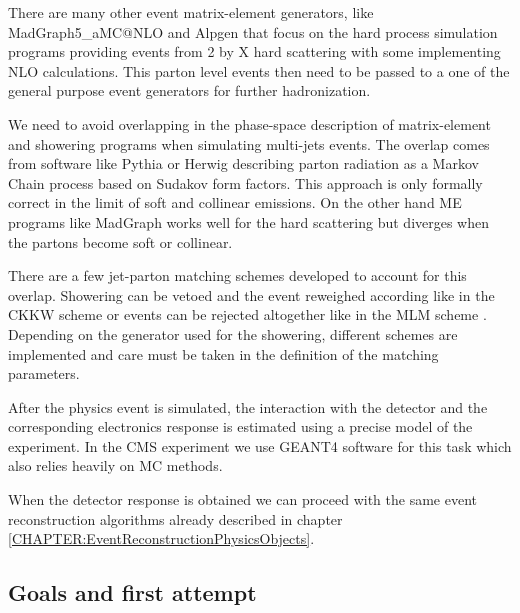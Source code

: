 There are many other event  matrix-element generators, like MadGraph5\_aMC@NLO \cite{ARTICLE:aMCatNLO} and Alpgen \cite{ARTICLE:ALPGENGenerator} that focus on the hard process simulation programs providing events from 2 by X hard scattering with some implementing \gls{NLO} calculations. This parton level events then need to be passed to a one of the general purpose event generators for further hadronization. 

We need to avoid overlapping in the phase-space description of matrix-element and showering programs when simulating multi-jets events. The overlap comes from software like Pythia or Herwig describing parton radiation as a Markov Chain process based on Sudakov form factors. This approach is only formally correct in the limit of soft and collinear emissions. On the other hand \gls{ME} programs like MadGraph works well for the hard scattering but diverges when the partons become soft or collinear. 

There are a few jet-parton matching schemes developed to account for this overlap. Showering can be vetoed and the event reweighed according like in the CKKW scheme \cite{ARTICLE:CKKWSchemeRef1,ARTICLE:CKKWSchemeRef2,ARTICLE:CKKWSchemeRef3} or events can be rejected altogether like in the MLM scheme \cite{ARTICLE:MLMScheme}. Depending on the generator used for the showering, different schemes are implemented and care must be taken in the definition of the matching parameters.

After the physics event is simulated, the interaction with the detector and the corresponding electronics response is estimated using a precise model of the experiment. In the \gls{CMS} experiment we use GEANT4 \cite{ARTICLE:GEANT4ASimulationToolkit,ARTICLE:Geant4DevelopmentsAndApplications} software for this task which also relies heavily on \gls{MC} methods. 

When the detector response is obtained we can proceed with the same event reconstruction algorithms already described in chapter \ref{CHAPTER:EventReconstructionPhysicsObjects}. 

\subsection{Goals and first attempt}
\label{SUBSECTION:RunIIPreparation_GoalsAndFirstAttempt}

